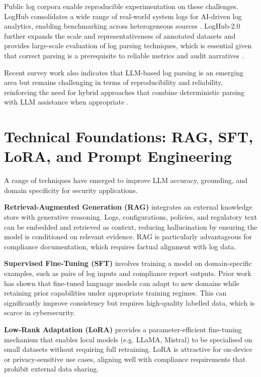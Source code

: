 \documentclass[]{UCD_CS_FYP_Report}
\begin{document}
        Public log corpora enable reproducible experimentation on these challenges. LogHub consolidates a wide range of real-world system logs for AI-driven log analytics, enabling benchmarking across heterogeneous sources \cite{Zhu2023Loghub}. LogHub-2.0 further expands the scale and representativeness of annotated datasets and provides large-scale evaluation of log parsing techniques, which is essential given that correct parsing is a prerequisite to reliable metrics and audit narratives \cite{Jiang2024Loghub20}.

        Recent survey work also indicates that LLM-based log parsing is an emerging area but remains challenging in terms of reproducibility and reliability, reinforcing the need for hybrid approaches that combine deterministic parsing with LLM assistance when appropriate \cite{Beck2025LLMLogParsing}.

\section{Technical Foundations: RAG, SFT, LoRA, and Prompt Engineering}
\label{sec:technical_foundations}
        A range of techniques have emerged to improve LLM accuracy, grounding, and domain specificity for security applications.

        \textbf{Retrieval-Augmented Generation (RAG)}\cite{RAG2020} integrates an external knowledge store with generative reasoning. Logs, configurations, policies, and regulatory text can be embedded and retrieved as context, reducing hallucination by ensuring the model is conditioned on relevant evidence. RAG is particularly advantageous for compliance documentation, which requires factual alignment with log data.

        \textbf{Supervised Fine-Tuning (SFT)} involves training a model on domain-specific examples, such as pairs of log inputs and compliance report outputs. Prior work has shown that fine-tuned language models can adapt to new domains while retaining prior capabilities under appropriate training regimes\cite{SFT2022}. This can significantly improve consistency but requires high-quality labelled data, which is scarce in cybersecurity.

        \textbf{Low-Rank Adaptation (LoRA)}\cite{LoRA2021} provides a parameter-efficient fine-tuning mechanism that enables local models (e.g. LLaMA, Mistral) to be specialised on small datasets without requiring full retraining. LoRA is attractive for on-device or privacy-sensitive use cases, aligning well with compliance requirements that prohibit external data sharing.
\end{document}
